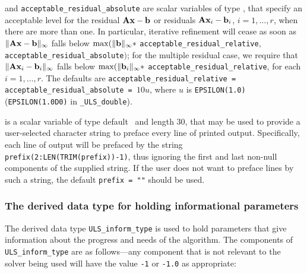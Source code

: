 \documentclass{galahad}
\newcommand{\packagename}{ULS}
\newcommand{\fullpackagename}{\libraryname\_\-\packagename}
\begin{document}
\begin{description}
  and {\tt acceptable\_residual\_absolute}
are scalar variables of type \realdp, that
specify an acceptable level for the residual ${\mathbf{A}} {\mathbf{x}} - {\mathbf{b}}$ or residuals
${\mathbf{A}} {\mathbf{x}}_i - {\mathbf{b}}_i$, $i=1,\ldots,r$,  when there are more than one.
In particular, iterative refinement will cease as soon as
$\|{\mathbf{A}} {\mathbf{x}} - {\mathbf{b}}\|_{\infty}$ falls below
$\max (\| {\mathbf{b}}\|_{\infty} \ast$ {\tt acceptable\_residual\_relative},
{\tt acceptable\_residual\_absolute}$)$;
for the multiple residual case, we require that
$\|{\mathbf{A}} {\mathbf{x}}_i - {\mathbf{b}}_i\|_{\infty}$ falls below
$\max (\| {\mathbf{b}}_i\|_{\infty} \ast$ {\tt acceptable\_residual\_relative},
for each $i=1,\ldots,r$.
The defaults are {\tt acceptable\_residual\_relative =
acceptable\_resi\-dual\_absolute = }$10 u$,
where $u$ is {\tt EPSILON(1.0)} ({\tt EPSILON(1.0D0)} in
{\tt \fullpackagename\_double}).

 is a scalar variable of type default \character\
and length 30, that may be used to provide a user-selected
character string to preface every line of printed output.
Specifically, each line of output will be prefaced by the string
{\tt prefix(2:LEN(TRIM(prefix))-1)},
thus ignoring the first and last non-null components of the
supplied string. If the user does not want to preface lines by such
a string, the default {\tt prefix = ""} should be used.

\end{description}


\subsubsection{The derived data type for holding informational
 parameters}\label{typeinform}
The derived data type
{\tt \packagename\_inform\_type}
is used to hold parameters that give information about the progress and needs
of the algorithm. The components of
{\tt \packagename\_inform\_type}
are as follows---any component that is not relevant to the solver being used
will have the value {\tt -1} or {\tt -1.0} as appropriate:
\end{document}
